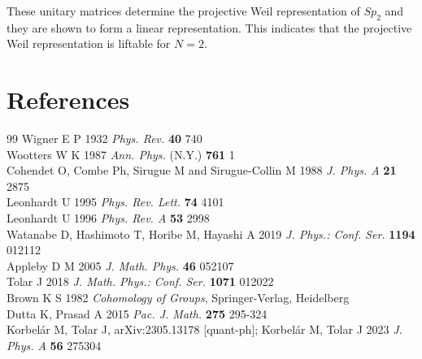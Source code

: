 \documentclass[12pt]{iopart}
\begin{document}
These unitary matrices determine the projective Weil representation of \(Sp_2\)
and they are shown to form a linear representation.
%
This indicates that the projective Weil representation is liftable for \(N=2\).

\newpage

\section*{References}
%
%

\begin{thebibliography}{99}
   Wigner E P 1932 {\it Phys. Rev.} {\bf 40} 740 \\
   Wootters W K 1987 {\it Ann. Phys.} (N.Y.) {\bf 761} 1 \\
   Cohendet O, Combe Ph, Sirugue M and Sirugue-Collin M 1988 {\it J. Phys. A} {\bf 21} 2875 \\
   Leonhardt U 1995 {\it Phys. Rev. Lett.} {\bf 74} 4101 \\
   Leonhardt U 1996 {\it Phys. Rev. A} {\bf 53} 2998 \\
   Watanabe D, Hashimoto T, Horibe M, Hayashi A 2019 {\it J. Phys.: Conf. Ser.} {\bf 1194} 012112 \\
   Appleby D M 2005 {\it J. Math. Phys.} {\bf 46} 052107 \\
   Tolar J 2018 {\it J. Math. Phys.: Conf. Ser.} {\bf 1071} 012022 \\
   Brown K S 1982 {\it Cohomology of Groups}, Springer-Verlag, Heidelberg \\
   Dutta K, Prasad A 2015 {\it Pac. J. Math.} {\bf 275} 295-324 \\
   Korbel\'ar M, Tolar J, arXiv:2305.13178 [quant-ph]; Korbel\'ar M, Tolar J 2023 {\it J. Phys. A} {\bf 56} 275304 \\
\end{thebibliography}
\end{document}
